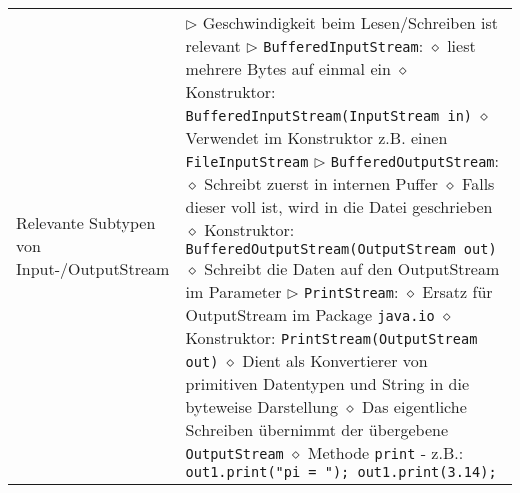 \begin{longtable}{ | p{} p{} | }
	\makecell[l]{Relevante Subtypen  von \\Input-/OutputStream} & \makecell[l]{
	$\rhd$ Geschwindigkeit beim Lesen/Schreiben ist relevant \\
	$\rhd$ \texttt{BufferedInputStream}: \\
	\hspace{0.4cm} $\diamond$ liest mehrere Bytes auf einmal ein \\
	\hspace{0.4cm} $\diamond$ Konstruktor: \texttt{BufferedInputStream(InputStream in)} \\
	\hspace{0.4cm} $\diamond$ Verwendet im Konstruktor z.B. einen \texttt{FileInputStream} \\
	$\rhd$ \texttt{BufferedOutputStream}: \\
	\hspace{0.4cm} $\diamond$ Schreibt zuerst in internen Puffer \\
	\hspace{0.4cm} $\diamond$ Falls dieser voll ist, wird in die Datei geschrieben \\
	\hspace{0.4cm} $\diamond$ Konstruktor: \texttt{BufferedOutputStream(OutputStream out)} \\
	\hspace{0.4cm} $\diamond$ Schreibt die Daten auf den OutputStream im Parameter \\
	$\rhd$ \texttt{PrintStream}: \\
	\hspace{0.4cm} $\diamond$ Ersatz für OutputStream im Package \texttt{java.io} \\
	\hspace{0.4cm} $\diamond$ Konstruktor: \texttt{PrintStream(OutputStream out)} \\
	\hspace{0.4cm} $\diamond$ Dient als Konvertierer von primitiven Datentypen und String \\
	\hspace{0.8cm} in die byteweise Darstellung \\
	\hspace{0.4cm} $\diamond$ Das eigentliche Schreiben übernimmt der übergebene \texttt{OutputStream} \\
	\hspace{0.4cm} $\diamond$ Methode \texttt{print} \\ 
	\hspace{0.6cm} - z.B.: \texttt{out1.print("pi = "); out1.print(3.14);} \\
}
\end{longtable}
